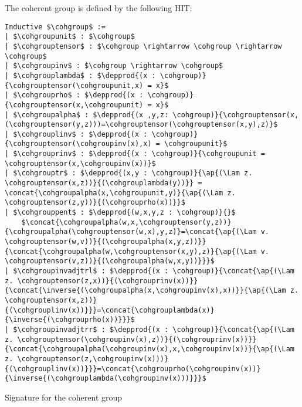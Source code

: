 The coherent group is defined by the following HIT:
\begin{lstlisting}[mathescape=true]
Inductive $\cohgroup$ :=
| $\cohgroupunit$ : $\cohgroup$
| $\cohgrouptensor$ : $\cohgroup \rightarrow \cohgroup \rightarrow \cohgroup$
| $\cohgroupinv$ : $\cohgroup \rightarrow \cohgroup$
| $\cohgrouplambda$ : $\depprod{(x : \cohgroup)}{\cohgrouptensor(\cohgroupunit,x) = x}$
| $\cohgrouprho$ : $\depprod{(x : \cohgroup)}{\cohgrouptensor(x,\cohgroupunit) = x}$
| $\cohgroupalpha$ : $\depprod{(x ,y,z: \cohgroup)}{\cohgrouptensor(x,(\cohgrouptensor(y,z)))=\cohgrouptensor(\cohgrouptensor(x,y),z)}$
| $\cohgrouplinv$ : $\depprod{(x : \cohgroup)}{\cohgrouptensor(\cohgroupinv(x),x) = \cohgroupunit}$
| $\cohgrouprinv$ : $\depprod{(x : \cohgroup)}{\cohgroupunit = \cohgrouptensor(x,\cohgroupinv(x))}$
| $\cohgrouptr$ : $\depprod{(x,y : \cohgroup)}{\ap{(\Lam z. \cohgrouptensor(x,z))}{(\cohgrouplambda(y))}} = \concat{\cohgroupalpha(x,\cohgroupunit,y)}{\ap{(\Lam z. \cohgrouptensor(z,y))}{(\cohgrouprho(x))}}$
| $\cohgrouppent$ : $\depprod{(w,x,y,z : \cohgroup)}{}$
    $\concat{\cohgroupalpha(w,x,\cohgrouptensor(y,z))}{\cohgroupalpha(\cohgrouptensor(w,x),y,z)}=\concat{\ap{(\Lam v. \cohgrouptensor(w,v))}{(\cohgroupalpha(x,y,z))}}{\concat{\cohgroupalpha(w,\cohgrouptensor(x,y),z)}{\ap{(\Lam v. \cohgrouptensor(v,z))}{(\cohgroupalpha(w,x,y))}}}$
| $\cohgroupinvadjtrl$ : $\depprod{(x : \cohgroup)}{\concat{\ap{(\Lam z. \cohgrouptensor(z,x))}{(\cohgrouprinv(x))}}{\concat{\inverse{(\cohgroupalpha(x,\cohgroupinv(x),x))}}{\ap{(\Lam z. \cohgrouptensor(x,z))}{(\cohgrouplinv(x))}}}=\concat{\cohgrouplambda(x)}{\inverse{(\cohgrouprho(x))}}}$
| $\cohgroupinvadjtrr$ : $\depprod{(x : \cohgroup)}{\concat{\ap{(\Lam z. \cohgrouptensor(\cohgroupinv(x),z))}{(\cohgrouprinv(x))}}{\concat{\cohgroupalpha(\cohgroupinv(x),x,\cohgroupinv(x))}{\ap{(\Lam z. \cohgrouptensor(z,\cohgroupinv(x)))}{(\cohgrouplinv(x))}}}=\concat{\cohgrouprho(\cohgroupinv(x))}{\inverse{(\cohgrouplambda(\cohgroupinv(x)))}}}$
\end{lstlisting}





Signature for the coherent group
